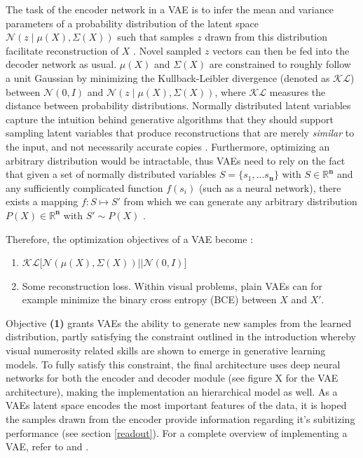 \documentclass[twocolumn]{article}
\providecommand{\tightlist}{%
  \setlength{\itemsep}{0pt}\setlength{\parskip}{0pt}}
\begin{document}
The task of the encoder network in a VAE is to infer the mean and
variance parameters of a probability distribution of the latent space
\(\mathcal{N}(z \mathbin{\vert} \mu(X), \Sigma(X))\) such that samples
\(z\) drawn from this distribution facilitate reconstruction of \(X\)
\citep{doersch2016tutorial}. Novel sampled \(z\) vectors can then be fed
into the decoder network as usual. \(\mu(X)\) and \(\Sigma(X)\) are
constrained to roughly follow a unit Gaussian by minimizing the
Kullback-Leibler divergence (denoted as \(\mathcal{KL}\)) between
\(\mathcal{N}(0, I)\) and
\(\mathcal{N}(z \mathbin{\vert} \mu(X), \Sigma(X))\), where
\(\mathcal{KL}\) measures the distance between probability
distributions. Normally distributed latent variables capture the
intuition behind generative algorithms that they should support sampling
latent variables that produce reconstructions that are merely
\emph{similar} to the input, and not necessarily accurate copies \citep{doersch2016tutorial}.
Furthermore, optimizing an arbitrary distribution would be intractable,
thus VAEs need to rely on the fact that given a set of normally
distributed variables \(S = \{s_1, ... s_\mathbf{n}\}\) with
\(S \in \mathbb{R}^{\mathbf{n}}\) and any sufficiently complicated
function \(f(s_i)\) (such as a neural network), there exists a mapping
\(f: S \mapsto S'\) from which we can generate any arbitrary
distribution \(P(X) \in \mathbb{R}^{\mathbf{n}}\) with \(S' \sim P(X)\)
\citep{doersch2016tutorial}.

Therefore, the optimization objectives of a VAE become \citep[also see
figure 4 of][]{doersch2016tutorial}:

\begin{enumerate}
\def\labelenumi{\arabic{enumi}.}
\tightlist
\item
  \(\mathcal{KL}\lbrack\mathcal{N}(\mu(X), \Sigma(X)) \vert\vert \mathcal{N}(0, I)\rbrack\)
\item
  Some reconstruction loss. Within visual problems, plain VAEs can for
  example minimize the binary cross entropy (BCE) between \(X\) and
  \(X'\).
\end{enumerate}

Objective \textbf{(1)} grants VAEs the ability to generate new samples
from the learned distribution, partly satisfying the constraint outlined
in the introduction whereby visual numerosity related skills are shown to emerge in
generative learning models. To fully satisfy this constraint, the final
architecture uses deep neural networks for both the encoder and decoder
module (see figure X for the VAE architecture), making the
implementation an hierarchical model as well. As a VAEs latent space
encodes the most important features of the data, it is hoped the samples
drawn from the encoder provide information regarding it's subitizing
performance (see section \ref{readout}). For
a complete overview of implementing a VAE, refer to
\citet{kingma2013auto} and \citet{doersch2016tutorial}.
\end{document}

